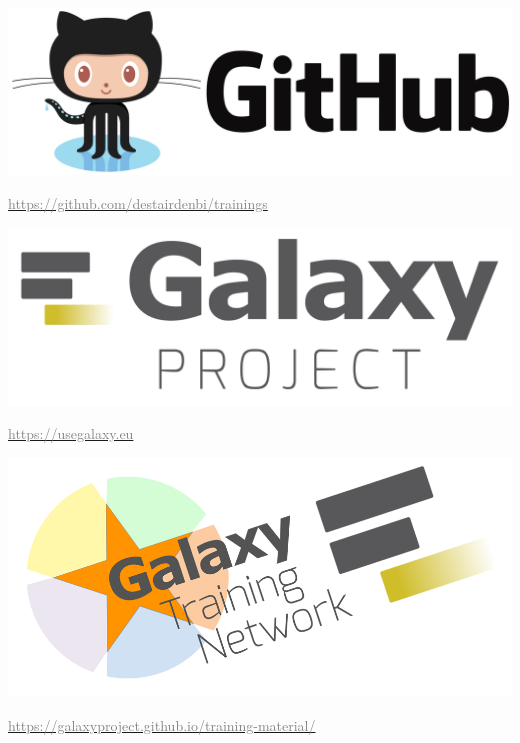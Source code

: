 \documentclass[x11names, svgnames]{beamer}
\begin{document}
%
%
%
\begin{frame}
  \frametitle{\five}
  \begin{center}
    \vspace{-1em}
    \includegraphics[scale=0.05]{images/logo_github}
  \end{center}
  \begin{center}
    \vspace{-1em}
    \footnotesize{\href{https://github.com/destairdenbi/trainings}{\textcolor{gray}{https://github.com/destairdenbi/trainings}}}
  \end{center}
  \begin{center}
    \vspace{1.5em}
    \includegraphics[scale=0.05]{images/logo_galaxy}
  \end{center}
  \begin{center}
    \vspace{-1em}
    \footnotesize{\href{https://usegalaxy.eu}{\textcolor{gray}{https://usegalaxy.eu}}}
  \end{center}
  \begin{center}
    \vspace{1.5em}
    \includegraphics[scale=0.08]{images/logo_gtn}
  \end{center}
  \begin{center}
    \vspace{-1em}
    \footnotesize{\href{https://galaxyproject.github.io/training-material/}{\textcolor{gray}{https://galaxyproject.github.io/training-material/}}}
  \end{center}
\end{frame}
\end{document}

